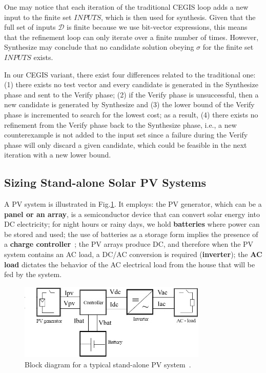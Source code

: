 \documentclass[runningheads]{llncs}
\begin{document}
One may notice that each iteration of the traditional CEGIS loop adds a new input to the finite set $INPUTS$, which is then used for synthesis. Given that the full set of inputs $\mathcal{D}$ is finite because we use bit-vector expressions, this means that the refinement loop can only iterate over a finite number of times. However, {\sc Synthesize} may conclude that no candidate solution obeying $\sigma$ for the finite set $INPUTS$ exists. %

In our CEGIS variant, there exist four differences related to the traditional one: 
(1) there exists no test vector and every candidate is generated in the {\sc Synthesize} phase and sent to the {\sc Verify} phase; 
(2) if the {\sc Verify} phase is unsuccessful, then a new candidate is generated by {\sc Synthesize} and 
(3) the lower bound of the {\sc Verify} phase is incremented to search for the lowest cost; as a result,
(4) there exists no refinement from the {\sc Verify} phase back to the {\sc Synthesize} phase, i.e., a new counterexample is not added to the {\sc input} set since a failure during the {\sc Verify} phase will only discard a given candidate, which could be feasible in the next iteration with a new lower bound.

\subsection{Sizing Stand-alone Solar PV Systems}
\label{sec:sizing}

A PV system is illustrated in Fig.\ref{fig:blockdiagram}. It 
employs: the PV generator, which can be a \textbf{panel or an array}, is a semiconductor device that can convert solar energy into DC electricity; for night hours or rainy days, we hold \textbf{batteries} where power can be stored and used; the use of batteries as a storage form implies the presence of a \textbf{charge controller}~\cite{Hansen}; the PV arrays produce DC, and therefore when the PV system contains an AC load, a DC/AC conversion is required (\textbf{inverter}); the \textbf{AC load} dictates the behavior of the AC electrical load from the house that will be fed by the system.

\begin{figure}[h]
\includegraphics[width=0.8\textwidth]{blockdiagramPVS2_rev}
\centering
\caption{Block diagram for a typical stand-alone PV system~\cite{Hansen}.}
\label{fig:blockdiagram} 
\end{figure}
\end{document}
